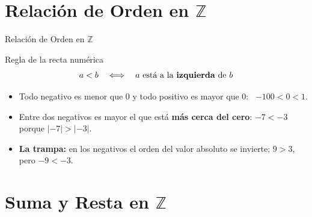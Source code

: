 \documentclass[aspectratio=169]{beamer}
\newcommand{\Z}{\mathbb{Z}}
\begin{document}
\section{Relación de Orden en $\Z$}

\begin{frame}{Relación de Orden en $\Z$}
  \begin{block}{Regla de la recta numérica}
    \[
      a < b \quad \Longleftrightarrow \quad a \text{ está a la \textbf{izquierda} de } b
    \]
    \begin{itemize}
      \item Todo negativo es menor que $0$ y todo positivo es mayor que $0$: \ $-100 < 0 < 1$.
      \item Entre dos negativos es mayor el que está \textbf{más cerca del cero}:
            $-7 < -3$ porque $|-7| > |-3|$.
      \item \textbf{La trampa:} en los negativos el orden del valor absoluto se invierte;
            $9 > 3$, pero $-9 < -3$.
    \end{itemize}
  \end{block}
  \begin{center}
  \end{center}
\end{frame}

\section{Suma y Resta en $\Z$}
\end{document}
